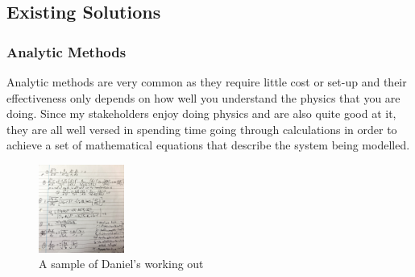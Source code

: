 \documentclass[11pt]{article}
\begin{document}
        \subsection{Existing Solutions}
            \subsubsection{Analytic Methods}
                Analytic methods are very common as they require little cost or set-up and their effectiveness only depends on how well you understand the physics that you are doing. Since my stakeholders enjoy doing physics and are also quite good at it, they are all well versed in spending time going through calculations in order to achieve a set of mathematical equations that describe the system being modelled. 

                \begin{figure}[!ht]
                    \begin{center}
                        \includegraphics[width=0.25\textwidth]{figures/daniel_working.jpeg}
                    \end{center}
                    \caption{A sample of Daniel's working out}
                    \label{fig:daniel_working}
                \end{figure}
\end{document}
